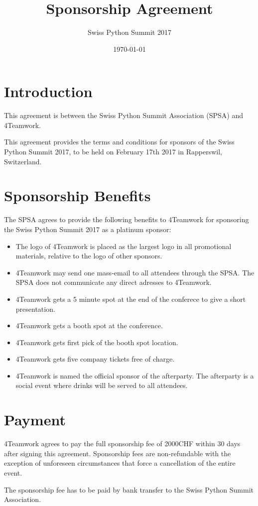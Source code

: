 \documentclass[11pt,enlargefirstpage=true,headlines=4]{scrartcl}
\title{Sponsorship Agreement}
\subtitle{Swiss Python Summit 2017}
\date{\today} %
\begin{document}
    \maketitle

    \section{Introduction}

    This agreement is between the Swiss Python Summit Association (SPSA) and
    4Teamwork.

    This agreement provides the terms and conditions for sponsors of the Swiss
    Python Summit 2017, to be held on February 17th 2017 in Rapperswil,
    Switzerland.

    \section{Sponsorship Benefits}

    The SPSA agrees to provide the following benefits to 4Teamwork for sponsoring
    the Swiss Python Summit 2017 as a platinum sponsor:

    \begin{itemize}
        \item The logo of 4Teamwork is placed as the largest logo in all promotional materials, relative to the logo of other sponsors.
        \item 4Teamwork may send one mass-email to all attendees through the SPSA. The SPSA does not communicate any direct adresses to 4Teamwork.
        \item 4Teamwork gets a 5 minute spot at the end of the conferece to give a short presentation.
        \item 4Teamwork gets a booth spot at the conference.
        \item 4Teamwork gets first pick of the booth spot location.
        \item 4Teamwork gets five company tickets free of charge.
        \item 4Teamwork is named the official sponsor of the afterparty. The afterparty is a social event where drinks will be served to all attendees.
    \end{itemize}

    \section{Payment}

    4Teamwork agrees to pay the full sponsorship fee of 2000CHF within 30 days
    after signing this agreement. Sponsorship fees are non‐refundable with the
    exception of unforeseen circumstances that force a cancellation of the entire
    event.

    The sponsorship fee has to be paid by bank transfer to the Swiss Python
    Summit Association.

    \quad
\end{document}
